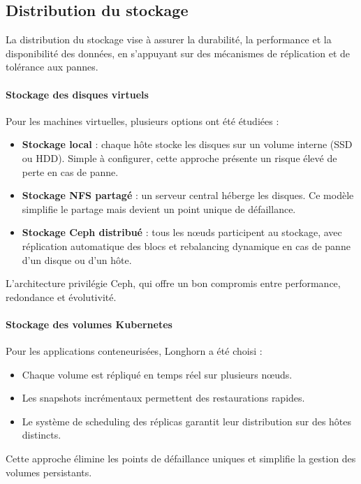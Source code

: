 \subsection{Distribution du stockage}

La distribution du stockage vise à assurer la durabilité, la performance et la disponibilité des données, en s’appuyant sur des mécanismes de réplication et de tolérance aux pannes.

\paragraph{Stockage des disques virtuels}
Pour les machines virtuelles, plusieurs options ont été étudiées :
\begin{itemize}
	\item \textbf{Stockage local} : chaque hôte stocke les disques sur un volume interne (SSD ou HDD). Simple à configurer, cette approche présente un risque élevé de perte en cas de panne.
	\item \textbf{Stockage NFS partagé} : un serveur central héberge les disques. Ce modèle simplifie le partage mais devient un point unique de défaillance.
	\item \textbf{Stockage Ceph distribué} : tous les nœuds participent au stockage, avec réplication automatique des blocs et rebalancing dynamique en cas de panne d’un disque ou d’un hôte.
\end{itemize}
L’architecture privilégie Ceph, qui offre un bon compromis entre performance, redondance et évolutivité.

\paragraph{Stockage des volumes Kubernetes}
Pour les applications conteneurisées, Longhorn a été choisi :
\begin{itemize}
	\item Chaque volume est répliqué en temps réel sur plusieurs nœuds.
	\item Les snapshots incrémentaux permettent des restaurations rapides.
	\item Le système de scheduling des réplicas garantit leur distribution sur des hôtes distincts.
\end{itemize}
Cette approche élimine les points de défaillance uniques et simplifie la gestion des volumes persistants.

